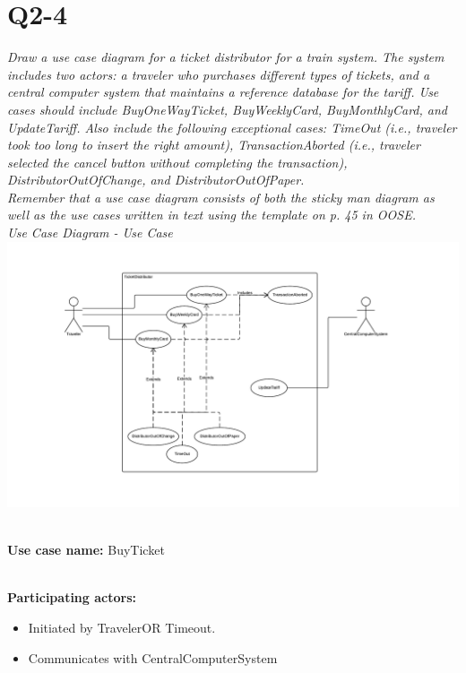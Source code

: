 \section{Q2-4}
\emph{Draw a use case diagram for a ticket distributor for a train system. The system includes two actors: a traveler who purchases different types of tickets, and a central computer system that maintains a reference database for the tariff. Use cases should include
BuyOneWayTicket, BuyWeeklyCard, BuyMonthlyCard, and UpdateTariff. Also include the following exceptional cases: TimeOut (i.e., traveler took too long to insert the right amount), TransactionAborted (i.e., traveler selected the cancel button without completing the transaction), DistributorOutOfChange, and DistributorOutOfPaper.}
\\
\emph{Remember that a use case diagram consists of both the sticky man diagram as well as the use cases written in text using the template on p. 45 in OOSE. }
\\
\emph{Use Case Diagram - Use Case}
\\
\includegraphics[scale=0.3]{Assignment-36-Use-Case-Diagram-Use-Case}

\HRule \\[0.4cm]

\textbf{Use case name:} BuyTicket

\HRule \\[0.4cm]

\textbf{Participating actors:}
\begin{itemize}
	\item Initiated by TravelerOR Timeout.
	\item Communicates with CentralComputerSystem
\end{itemize}

\HRule \\[0.4cm]

